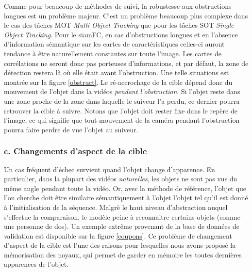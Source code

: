 \documentclass[10pt,twocolumn,letterpaper,french]{article}
\begin{document}
Comme pour beaucoup de méthodes de suivi, la robustesse aux obstructions longues est un problème majeur. C'est un problème beaucoup plus complexe dans le cas des tâches MOT \textit{Mutli Object Tracking} que pour les tâches SOT \textit{Single Object Tracking}. Pour le siamFC, en cas d'obstructions longues et en l'absence d'information sémantique sur les cartes de caractéristiques celles-ci auront tendance à être naturellement constantes sur toute l'image. Les cartes de corrélations ne seront donc pas porteuses d'informations, et par défaut, la zone de détection restera là où elle était avant l'obstruction. Une telle situations est montrée sur la figure \ref{obstruct}. Le ré-accrochage de la cible dépend donc du mouvement de l'objet dans la vidéos \textit{pendant l'obstruction}. Si l'objet reste dans une zone proche de la zone dans laquelle le suiveur l'a perdu, ce dernier pourra retrouver la cible à suivre. Notons que l'objet doit rester fixe dans le repère de l'image, ce qui signifie que tout mouvement de la caméra pendant l'obstruction pourra faire perdre de vue l'objet au suiveur. 






\subsubsection*{c. Changements d'aspect de la cible}
\label{aspect}

Un cas fréquent d'échec survient quand l'objet change d'apparence. En particulier, dans la plupart des vidéos \textit{naturelles}, les objets ne sont pas vus du même angle pendant toute la vidéo. Or, avec la méthode de référence, l'objet que l'on cherche doit être similaire sémantiquement à l'objet l'objet tel qu'il est donné à l'initialisation de la séquence. Malgrè le haut niveau d'abstraction auquel s'effectue la comparaison, le modèle peine à reconnaitre certains objets (comme une personne de dos). Un exemple extrême provenant de la base de données de validation est disponible sur la figure \ref{coupons}. 
Ce problème de changement d'aspect de la cible est l'une des raisons pour lesquelles nous avons proposé la mémorisation des noyaux, qui permet de garder en mémoire les toutes dernières apparences de l'objet.
\end{document}
